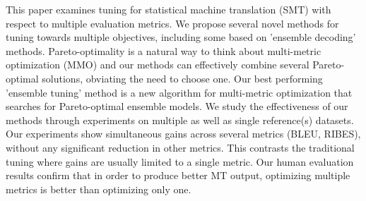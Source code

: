 This paper examines tuning for statistical machine translation (SMT) with respect to multiple evaluation metrics. We propose several novel methods for
 tuning towards multiple objectives, including some based on 'ensemble decoding'
 methods. Pareto-optimality is a natural way to think about multi-metric
 optimization (MMO) and our methods can effectively combine several
 Pareto-optimal solutions, obviating the need to choose one. Our best performing
 'ensemble tuning' method is a new algorithm for multi-metric optimization that
 searches for Pareto-optimal ensemble models. We  study the effectiveness of our
 methods through experiments on multiple as well as single reference(s)
 datasets. Our experiments show simultaneous gains across several metrics (BLEU,
 RIBES), without any significant reduction in other metrics. This contrasts the
 traditional tuning where gains are usually limited to a single metric. Our
 human evaluation results confirm that in order to produce better MT output,
 optimizing multiple metrics is better than optimizing only one.

